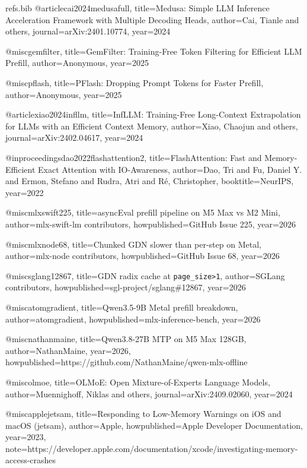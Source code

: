 \begin{filecontents*}[overwrite]{refs.bib}
@article{cai2024medusafull,
  title={{Medusa}: Simple {LLM} Inference Acceleration Framework with Multiple Decoding Heads},
  author={Cai, Tianle and others},
  journal={arXiv:2401.10774},
  year={2024}
}

@misc{gemfilter,
  title={{GemFilter}: Training-Free Token Filtering for Efficient {LLM} Prefill},
  author={Anonymous},
  year={2025}
}

@misc{pflash,
  title={{PFlash}: Dropping Prompt Tokens for Faster Prefill},
  author={Anonymous},
  year={2025}
}

@article{xiao2024infllm,
  title={{InfLLM}: Training-Free Long-Context Extrapolation for {LLMs} with an Efficient Context Memory},
  author={Xiao, Chaojun and others},
  journal={arXiv:2402.04617},
  year={2024}
}

@inproceedings{dao2022flashattention2,
  title={{FlashAttention}: Fast and Memory-Efficient Exact Attention with {IO}-Awareness},
  author={Dao, Tri and Fu, Daniel Y. and Ermon, Stefano and Rudra, Atri and R{\'e}, Christopher},
  booktitle={NeurIPS},
  year={2022}
}

@misc{mlxswift225,
  title={asyncEval prefill pipeline on {M5 Max} vs {M2 Mini}},
  author={{mlx-swift-lm contributors}},
  howpublished={GitHub Issue 225},
  year={2026}
}

@misc{mlxnode68,
  title={Chunked {GDN} slower than per-step on Metal},
  author={{mlx-node contributors}},
  howpublished={GitHub Issue 68},
  year={2026}
}

@misc{sglang12867,
  title={{GDN} radix cache at \texttt{page\_size>1}},
  author={{SGLang contributors}},
  howpublished={sgl-project/sglang\#12867},
  year={2026}
}

@misc{atomgradient,
  title={{Qwen3.5-9B} Metal prefill breakdown},
  author={atomgradient},
  howpublished={mlx-inference-bench},
  year={2026}
}

@misc{nathanmaine,
  title={{Qwen3.8-27B} {MTP} on {M5 Max} 128{GB}},
  author={NathanMaine},
  year={2026},
  howpublished={https://github.com/NathanMaine/qwen-mlx-offline}
}

@misc{olmoe,
  title={{OLMoE}: Open Mixture-of-Experts Language Models},
  author={Muennighoff, Niklas and others},
  journal={arXiv:2409.02060},
  year={2024}
}

@misc{applejetsam,
  title={Responding to Low-Memory Warnings on {iOS} and {macOS} (jetsam)},
  author={{Apple}},
  howpublished={Apple Developer Documentation},
  year={2023},
  note={https://developer.apple.com/documentation/xcode/investigating-memory-access-crashes}
}


\end{filecontents*}
